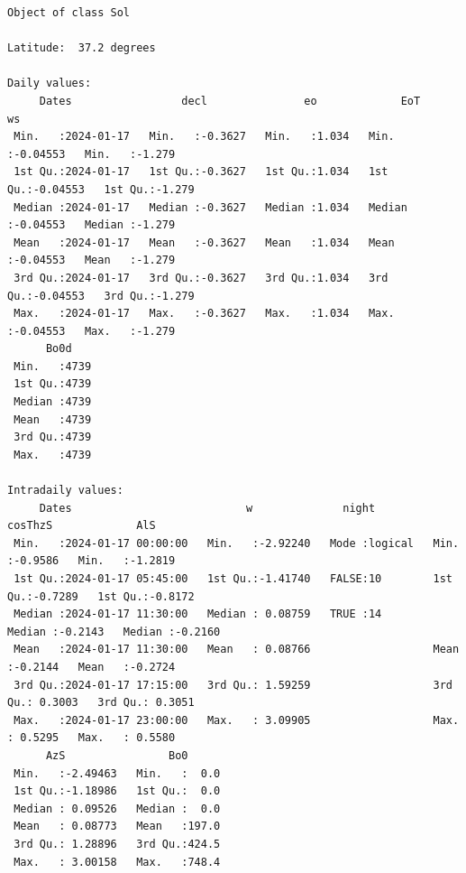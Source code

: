 \begin{verbatim}
Object of class Sol 

Latitude:  37.2 degrees

Daily values:
     Dates                 decl               eo             EoT                 ws        
 Min.   :2024-01-17   Min.   :-0.3627   Min.   :1.034   Min.   :-0.04553   Min.   :-1.279  
 1st Qu.:2024-01-17   1st Qu.:-0.3627   1st Qu.:1.034   1st Qu.:-0.04553   1st Qu.:-1.279  
 Median :2024-01-17   Median :-0.3627   Median :1.034   Median :-0.04553   Median :-1.279  
 Mean   :2024-01-17   Mean   :-0.3627   Mean   :1.034   Mean   :-0.04553   Mean   :-1.279  
 3rd Qu.:2024-01-17   3rd Qu.:-0.3627   3rd Qu.:1.034   3rd Qu.:-0.04553   3rd Qu.:-1.279  
 Max.   :2024-01-17   Max.   :-0.3627   Max.   :1.034   Max.   :-0.04553   Max.   :-1.279  
      Bo0d     
 Min.   :4739  
 1st Qu.:4739  
 Median :4739  
 Mean   :4739  
 3rd Qu.:4739  
 Max.   :4739  

Intradaily values: 
     Dates                           w              night            cosThzS             AlS         
 Min.   :2024-01-17 00:00:00   Min.   :-2.92240   Mode :logical   Min.   :-0.9586   Min.   :-1.2819  
 1st Qu.:2024-01-17 05:45:00   1st Qu.:-1.41740   FALSE:10        1st Qu.:-0.7289   1st Qu.:-0.8172  
 Median :2024-01-17 11:30:00   Median : 0.08759   TRUE :14        Median :-0.2143   Median :-0.2160  
 Mean   :2024-01-17 11:30:00   Mean   : 0.08766                   Mean   :-0.2144   Mean   :-0.2724  
 3rd Qu.:2024-01-17 17:15:00   3rd Qu.: 1.59259                   3rd Qu.: 0.3003   3rd Qu.: 0.3051  
 Max.   :2024-01-17 23:00:00   Max.   : 3.09905                   Max.   : 0.5295   Max.   : 0.5580  
      AzS                Bo0       
 Min.   :-2.49463   Min.   :  0.0  
 1st Qu.:-1.18986   1st Qu.:  0.0  
 Median : 0.09526   Median :  0.0  
 Mean   : 0.08773   Mean   :197.0  
 3rd Qu.: 1.28896   3rd Qu.:424.5  
 Max.   : 3.00158   Max.   :748.4
\end{verbatim}


